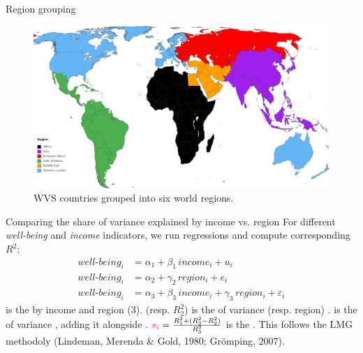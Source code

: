 \documentclass[aspectratio=169,xcolor=dvipsnames, 11pt,mathserif]{beamer}
\begin{document}
\begin{frame}{Region grouping}
    \begin{figure}
        \caption{WVS countries grouped into six world regions.}  
        \centering \includegraphics[height=.8\textheight]{../figures/region_groupings} %
    \end{figure}
\end{frame}

\begin{frame}{Comparing the share of variance explained by income vs. region}
    \bbvsp
    \ip For different \textit{well-being} and \textit{income} indicators, we run regressions and compute corresponding $R^2$:
    \begin{align} 
        well\text{-}being_i &= \alpha_1 + \beta_1\, income_i + u_i\\
        well\text{-}being_i &= \alpha_2 + \gamma_2\, region_i + e_i\\
        well\text{-}being_i &= \alpha_3 + \beta_3\, income_i + \gamma_3\, region_i + \varepsilon_i 
    \end{align} %
    \ip {} is the  by income and region (3).
    \ip {} (resp. $R^2_2$) is the  of variance  (resp. region) .
    \ip {} is the  of variance ,  adding it alongside . %
    \ip $\textcolor{magenta}{s_i} = \frac{R^2_1 + (R^2_3-R^2_2)}{R^2_3}$ is the .
    \ip This follows the LMG methodoly (Lindeman, Merenda \& Gold, 1980; Grömping, 2007).
    \ee
\end{frame}
              
\end{document}
